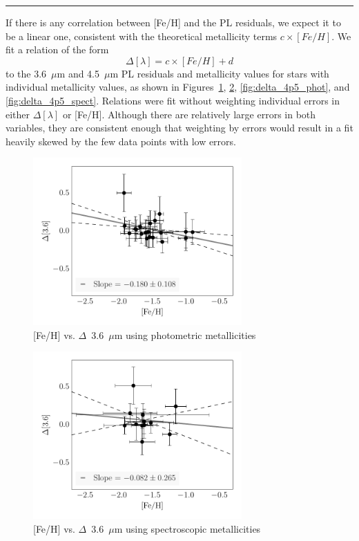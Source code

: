 \documentclass[a4paper,fleqn,usenatbib]{mnras}
\begin{document}
\noindent\rule[0.5ex]{\linewidth}{1pt}

If there is any correlation between [Fe/H] and the PL residuals, we expect it to be a linear one, consistent with the theoretical metallicity terms $c\times[Fe/H]$. We fit a relation of the form
\begin{equation}\Delta[\lambda] = c\times[Fe/H] + d\end{equation}
to the 3.6~$\mu$m and 4.5~$\mu$m PL residuals and metallicity values for stars with individual metallicity values, as shown in Figures~\ref{fig:delta_3p6_phot}, \ref{fig:delta_3p6_spect}, \ref{fig:delta_4p5_phot}, and \ref{fig:delta_4p5_spect}. Relations were fit without weighting individual errors in either $\Delta[\lambda]$ or [Fe/H]. Although there are relatively large errors in both variables, they are consistent enough that weighting by errors would result in a fit heavily skewed by the few data points with low errors.

\begin{figure}
\begin{center}
\includegraphics[width=80mm]{final_plots/delta_feh_3p6_phot.pdf}
\caption{[Fe/H] vs. $\Delta$~3.6~$\mu$m using photometric metallicities}
\label{fig:delta_3p6_phot}
\end{center}
\end{figure}


\begin{figure}
\begin{center}
\includegraphics[width=80mm]{final_plots/delta_feh_3p6_spect.pdf}
\caption{[Fe/H] vs. $\Delta$~3.6~$\mu$m using spectroscopic metallicities}
\label{fig:delta_3p6_spect}
\end{center}
\end{figure}
\end{document}
